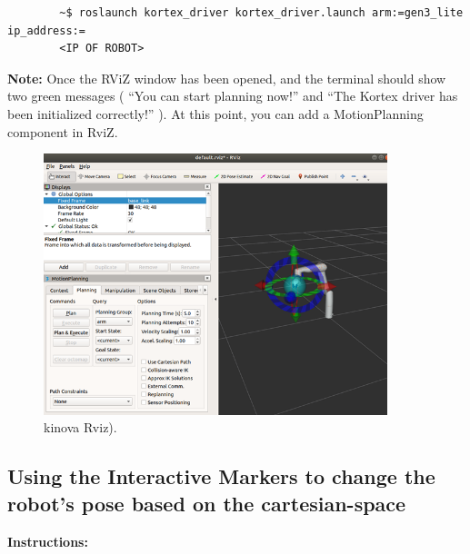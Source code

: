 \documentclass[12pt]{article}
\begin{document}
\begin{verbatim}
        ~$ roslaunch kortex_driver kortex_driver.launch arm:=gen3_lite ip_address:=
        <IP OF ROBOT>
    \end{verbatim}

\textbf{Note:} Once the RViZ window has been opened, and the terminal should show two green messages ( “You can start planning now!” and “The Kortex driver has been initialized correctly!” ). At this point, you can add a MotionPlanning component in RviZ.


\begin{figure}[H]
    \vspace{-10pt}
    \centering\includegraphics[width=10cm]{images/kinovaRviz.PNG}\vspace{-10pt}
    \caption{kinova Rviz).}\label{fig:kinovarviz}
    \end{figure}

\subsection{Using the Interactive Markers to change the robot’s pose based on the cartesian-space}


\textbf{Instructions:}
\end{document}
